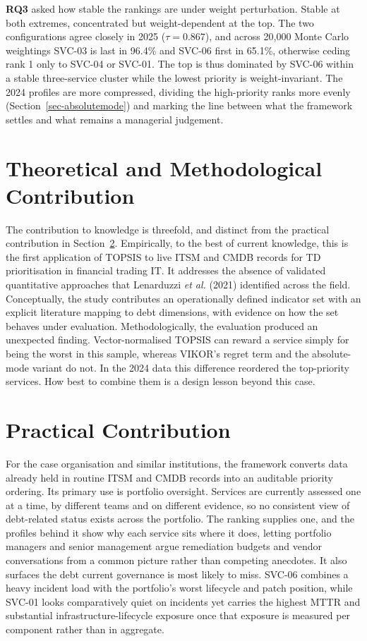 \documentclass[
  12pt,
  letterpaper,
  12pt,
  oneside,
  english,
  onehalfspacing,
  headsepline]{MastersDoctoralThesis}
\begin{document}
\textbf{RQ3} asked how stable the rankings are under weight
perturbation. Stable at both extremes, concentrated but weight-dependent
at the top. The two configurations agree closely in 2025
(\(\tau = 0.867\)), and across 20,000 Monte Carlo weightings SVC-03 is
last in 96.4\% and SVC-06 first in 65.1\%, otherwise ceding rank 1 only
to SVC-04 or SVC-01. The top is thus dominated by SVC-06 within a stable
three-service cluster while the lowest priority is weight-invariant. The
2024 profiles are more compressed, dividing the high-priority ranks more
evenly (Section~\ref{sec-absolutemode}) and marking the line between
what the framework settles and what remains a managerial judgement.

\section{Theoretical and Methodological
Contribution}\label{theoretical-and-methodological-contribution}

The contribution to knowledge is threefold, and distinct from the
practical contribution in Section~\ref{sec-practicalcontribution}.
Empirically, to the best of current knowledge, this is the first
application of TOPSIS to live ITSM and CMDB records for TD
prioritisation in financial trading IT. It addresses the absence of
validated quantitative approaches that Lenarduzzi \emph{et al.} (2021)
identified across the field. Conceptually, the study contributes an
operationally defined indicator set with an explicit literature mapping
to debt dimensions, with evidence on how the set behaves under
evaluation. Methodologically, the evaluation produced an unexpected
finding. Vector-normalised TOPSIS can reward a service simply for being
the worst in this sample, whereas VIKOR's regret term and the
absolute-mode variant do not. In the 2024 data this difference reordered
the top-priority services. How best to combine them is a design lesson
beyond this case.

\section{Practical Contribution}\label{sec-practicalcontribution}

For the case organisation and similar institutions, the framework
converts data already held in routine ITSM and CMDB records into an
auditable priority ordering. Its primary use is portfolio oversight.
Services are currently assessed one at a time, by different teams and on
different evidence, so no consistent view of debt-related status exists
across the portfolio. The ranking supplies one, and the profiles behind
it show why each service sits where it does, letting portfolio managers
and senior management argue remediation budgets and vendor conversations
from a common picture rather than competing anecdotes. It also surfaces
the debt current governance is most likely to miss. SVC-06 combines a
heavy incident load with the portfolio's worst lifecycle and patch
position, while SVC-01 looks comparatively quiet on incidents yet
carries the highest MTTR and substantial infrastructure-lifecycle
exposure once that exposure is measured per component rather than in
aggregate.
\end{document}
